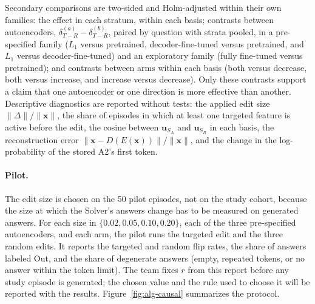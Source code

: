 Secondary comparisons are two-sided and Holm-adjusted within their own
families: the effect in each stratum, within each basis; contrasts between
autoencoders, $\delta_{T-R}^{(a)} - \delta_{T-R}^{(b)}$, paired by question
with strata pooled, in a pre-specified family ($L_1$ versus pretrained,
decoder-fine-tuned versus pretrained, and $L_1$ versus decoder-fine-tuned) and
an exploratory family (fully fine-tuned versus pretrained); and contrasts
between arms within each basis (both versus decrease, both versus increase,
and increase versus decrease). Only these contrasts support a claim that one
autoencoder or one direction is more effective than another. Descriptive
diagnostics are reported without tests: the applied edit size
$\|\Delta\|/\|\mathbf{x}\|$, the share of episodes in which at least one
targeted feature is active before the edit, the cosine between
$\mathbf{u}_{S_A}$ and $\mathbf{u}_{S_R}$ in each basis, the reconstruction
error $\|\mathbf{x} - D(E(\mathbf{x}))\|/\|\mathbf{x}\|$, and the change in
the log-probability of the stored A2's first token.

\paragraph{Pilot.} The edit size is chosen on the 50 pilot episodes, not on
the study cohort, because the size at which the Solver's answers change has
to be measured on generated answers. For each size in
$\{0.02, 0.05, 0.10, 0.20\}$, each of the three pre-specified autoencoders,
and each arm, the pilot runs the targeted edit and the three random edits. It
reports the targeted and random flip rates, the share of answers labeled Out,
and the share of degenerate answers (empty, repeated tokens, or no answer
within the token limit). The team fixes $r$ from this report before any study
episode is generated; the chosen value and the rule used to choose it will be
reported with the results. Figure~\ref{fig:alg-causal} summarizes the
protocol.


